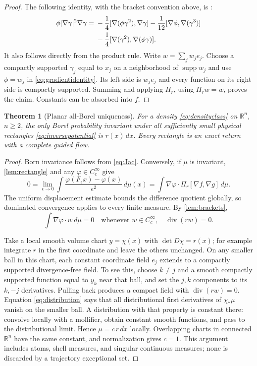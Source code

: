 \documentclass[11pt]{article}
\numberwithin{equation}{section}
\newtheorem{theorem}{Theorem}[section]
\theoremstyle{definition}
\newcommand{\R}{\mathbb R}
\newcommand{\Cc}{C_c^\infty}
\newcommand{\diver}{\operatorname{div}}
\newcommand{\supp}{\operatorname{supp}}
\begin{document}
\begin{proof}
The following identity, with the bracket convention above, is
\citet[version 2, equation (10)]{AGSmooth}:
\begin{align}\label{eq:gradientidentity}
 \phi|\nabla\gamma|^2\nabla\gamma
 ={}&-\frac14[\nabla(\phi\gamma^2),\nabla\gamma]
     -\frac1{12}[\nabla\phi,\nabla(\gamma^3)]\notag\\
    &-\frac14[\nabla(\gamma^2),\nabla(\phi\gamma)].
\end{align}
It also follows directly from the product rule.
Write $w=\sum_j w_j e_j$. Choose a compactly supported $\gamma_j$
equal to $x_j$ on a neighborhood of $\supp w_j$ and use
$\phi=w_j$ in \eqref{eq:gradientidentity}.
Its left side is $w_j e_j$ and every function on its right side is
compactly supported. Summing and applying $\Pi_r$, using $\Pi_rw=w$,
proves the claim. Constants can be absorbed into $f$.
\end{proof}

\begin{theorem}[Planar all-Borel uniqueness]\label{thm:plane}
For a density \eqref{eq:densityclass} on $\R^n$, $n\geq2$, the only
Borel probability invariant under all sufficiently small physical
rectangles \eqref{eq:inversepotential} is $r(x)\,dx$.
Every rectangle is an exact return with a complete guided flow.
\end{theorem}

\begin{proof}
Born invariance follows from \eqref{eq:Jac}. Conversely, if $\mu$ is
invariant, \cref{lem:rectangle} and any $\varphi\in\Cc$ give
\[
 0=\lim_{\epsilon\to0}\int
       \frac{\varphi(F_\epsilon x)-\varphi(x)}{\epsilon^2}\,d\mu(x)
   =\int\nabla\varphi\cdot\Pi_r[\nabla f,\nabla g]\,d\mu .
\]
The uniform displacement estimate bounds the difference quotient
globally, so dominated convergence applies to every finite measure.
By \cref{lem:brackets},
\begin{equation}\label{eq:distribution}
 \int\nabla\varphi\cdot w\,d\mu=0
 \quad\text{whenever } w\in\Cc,\quad\diver(rw)=0 .
\end{equation}

Take a local smooth volume chart $y=\chi(x)$ with
$\det D\chi=r(x)$; for example integrate $r$ in the first coordinate
and leave the others unchanged. On any smaller ball in this chart,
each constant coordinate field $e_j$ extends to a compactly supported
divergence-free field. To see this, choose $k\ne j$ and a smooth
compactly supported function equal to $y_k$ near that ball, and set
the $j,k$ components to its $k,-j$ derivatives.
Pulling back produces a compact field with $\diver(rw)=0$.
Equation \eqref{eq:distribution} says that all distributional first
derivatives of $\chi_*\mu$ vanish on the smaller ball. A distribution
with that property is constant there: convolve locally with a
mollifier, obtain constant smooth functions, and pass to the
distributional limit. Hence $\mu=c\,r\,dx$ locally. Overlapping
charts in connected $\R^n$ have the same constant, and normalization
gives $c=1$.
This argument includes atoms, shell measures, and singular continuous
measures; none is discarded by a trajectory exceptional set.
\end{proof}
\end{document}
